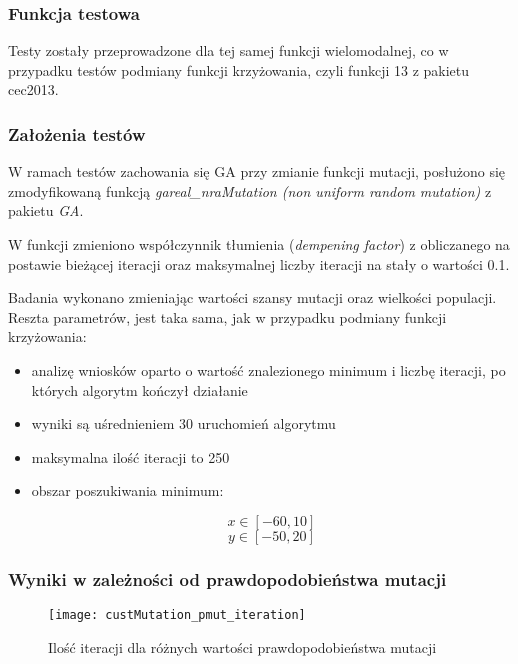 \subsubsection{Funkcja testowa}

Testy zostały przeprowadzone dla tej samej funkcji wielomodalnej, co w przypadku testów podmiany funkcji krzyżowania, czyli funkcji 13 z pakietu
cec2013.

\subsubsection{Założenia testów}

W ramach testów zachowania się GA przy zmianie funkcji mutacji, posłużono się zmodyfikowaną funkcją \textit{gareal\_nraMutation (non uniform random mutation)}
z pakietu \textit{GA}.

W funkcji zmieniono współczynnik tłumienia (\textit{dempening factor}) z obliczanego na postawie bieżącej iteracji oraz maksymalnej liczby iteracji na
stały o wartości 0.1.

Badania wykonano zmieniając wartości szansy mutacji oraz wielkości populacji.
Reszta parametrów, jest taka sama, jak w przypadku podmiany funkcji krzyżowania:

\begin{itemize}
\item analizę wniosków oparto o wartość znalezionego minimum i liczbę iteracji, po których algorytm kończył działanie
\item wyniki są uśrednieniem 30 uruchomień algorytmu
\item maksymalna ilość iteracji to 250
\item obszar poszukiwania minimum:

\begin{equation}
x\in [-60, 10]
\nonumber
\end{equation}
\begin{equation}
y\in [-50, 20]
\nonumber
\end{equation}

\end{itemize}


\subsubsection{Wyniki w zależności od prawdopodobieństwa mutacji}

\begin{figure}[H]
	\centering
	\texttt{[image: custMutation\_pmut\_iteration]}
	\caption{Ilość iteracji dla różnych wartości prawdopodobieństwa mutacji}
\end{figure}

